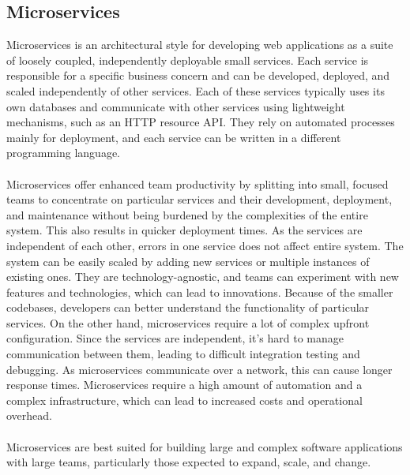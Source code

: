 \subsection{Microservices}
Microservices is an architectural style for developing web applications as a suite of loosely coupled, independently deployable small services. Each service is responsible for a specific business concern and can be developed, deployed, and scaled independently of other services. Each of these services typically uses its own databases and communicate with other services using lightweight mechanisms, such as an HTTP resource API. They rely on automated processes mainly for deployment, and each service can be written in a different programming language. \\\\
Microservices offer enhanced team productivity by splitting into small, focused teams to concentrate on particular services and their development, deployment, and maintenance without being burdened by the complexities of the entire system. This also results in quicker deployment times. As the services are independent of each other, errors in one service does not affect entire system. The system can be easily scaled by adding new services or multiple instances of existing ones. They are technology-agnostic, and teams can experiment with new features and technologies, which can lead to innovations. Because of the smaller codebases, developers can better understand the functionality of particular services. On the other hand, microservices require a lot of complex upfront configuration. Since the services are independent, it's hard to manage communication between them, leading to difficult integration testing and debugging. As microservices communicate over a network, this can cause longer response times. Microservices require a high amount of automation and a complex infrastructure, which can lead to increased costs and operational overhead.\\\\
Microservices are best suited for building large and complex software applications with large teams, particularly those expected to expand, scale, and change.